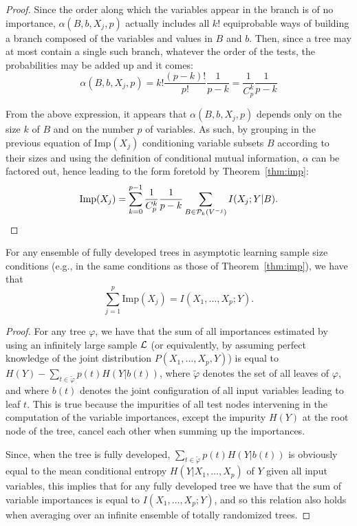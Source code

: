 \begin{proof}
Since the order along which the variables appear in the branch is of no
importance, $\alpha(B,b,X_j,p)$ actually includes all $k!$ equiprobable ways of
building a branch composed of the variables and values in $B$ and $b$. Then,
since a tree may at most contain a single such branch, whatever the order of the
tests, the probabilities may be added up and it comes:
\begin{equation}
\alpha(B,b,X_j,p)=k! \frac{(p-k)!}{p!} \frac{1}{p-k} = \frac{1}{C_p^k} \frac{1}{p-k}
\end{equation}\label{ntn:C_k_p}

From the above expression, it appears that $\alpha(B,b,X_j,p)$ depends only on
the size $k$ of $B$ and on the number $p$ of variables. As such, by grouping in
the previous equation of $\text{Imp}(X_j)$ conditioning variable subsets $B$ according
to their sizes and using the definition of conditional mutual information,
$\alpha$ can be factored out, hence leading to the form foretold by Theorem~\ref{thm:imp}:
\begin{equation}
\text{Imp}(X_j)=\sum_{k=0}^{p-1} \frac{1}{C^k_p} \frac{1}{p-k} \sum_{B \in {\cal P}_k(V^{-j})} I(X_j;Y|B).
\end{equation}
\end{proof}

\begin{theorem}\label{thm:sum-of-imp}
For any ensemble of fully developed trees in asymptotic learning sample size
conditions (e.g., in the same conditions as those of Theorem~\ref{thm:imp}), we
have that
\begin{equation}\label{eqn:sum-of-imp}
\sum_{j=1}^{p} \text{Imp}(X_j) = I(X_{1}, \ldots, X_{p} ; Y).
\end{equation}
\end{theorem}

\begin{proof}
For any tree $\varphi$, we have that the sum of all importances estimated by
using an infinitely large sample $\cal L$ (or equivalently, by assuming perfect
knowledge of the joint distribution $P(X_1, ..., X_p, Y)$) is equal to $H(Y) -
\sum_{t \in \widetilde{\varphi}} p(t) H(Y|b(t))$, where $\widetilde{\varphi}$
denotes the set of all leaves of $\varphi$, and where $b(t)$  denotes the joint
configuration of all input variables leading to leaf $t$. This is true because
the impurities of all test nodes intervening in the computation of the variable
importances, except the impurity $H(Y)$ at the root node of the tree, cancel
each other when summing up the importances.

Since, when the tree is fully developed, $\sum_{t \in \widetilde{\varphi}} p(t)
H(Y|b(t))$ is obviously equal to the mean conditional entropy $H(Y | X_{1},
\ldots, X_{p})$ of $Y$ given all input variables, this implies that for any
fully developed tree we have that the sum of variable importances is equal to
$I(X_{1}, \ldots, X_{p} ; Y)$, and so this relation also holds when averaging
over an infinite ensemble of totally randomized trees.
\end{proof}

